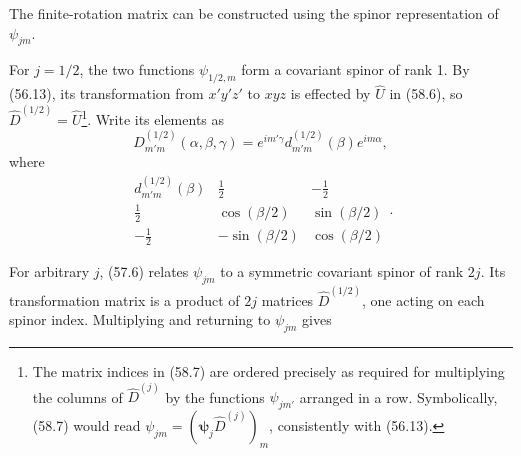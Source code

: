 The finite-rotation matrix can be constructed using the spinor representation of $\psi_{jm}$.

For $j=1/2$, the two functions $\psi_{1/2,m}$ form a covariant spinor of rank 1. By (56.13), its transformation from $x'y'z'$ to $xyz$ is effected by $\hat U$ in (58.6), so $\hat D^{(1/2)}=\hat U$\footnote{The matrix indices in (58.7) are ordered precisely as required for multiplying the columns of $\hat D^{(j)}$ by the functions $\psi_{jm'}$ arranged in a row. Symbolically, (58.7) would read $\psi_{jm}=(\boldsymbol\psi_j\hat D^{(j)})_m$, consistently with (56.13).}. Write its elements as
\[
 D^{(1/2)}_{m'm}(\alpha,\beta,\gamma)=e^{im'\gamma}d^{(1/2)}_{m'm}(\beta)e^{im\alpha},
\]
where
\begin{equation}
 \begin{array}{c|cc}
 d^{(1/2)}_{m'm}(\beta)&\frac12&-\frac12\\ \hline
 \frac12&\cos(\beta/2)&\sin(\beta/2)\\
 -\frac12&-\sin(\beta/2)&\cos(\beta/2)
 \end{array}.
 \tag{58.8}
\end{equation}

For arbitrary $j$, (57.6) relates $\psi_{jm}$ to a symmetric covariant spinor of rank $2j$. Its transformation matrix is a product of $2j$ matrices $\hat D^{(1/2)}$, one acting on each spinor index. Multiplying and returning to $\psi_{jm}$ gives

